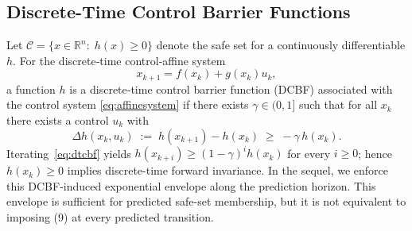 \documentclass[letterpaper, 10 pt, conference]{ieeeconf}
\begin{document}



\subsection{Discrete-Time Control Barrier Functions}
Let $\mathcal{C}=\{x\in\mathbb{R}^n:\; h(x)\ge 0\}$ denote the safe set for a continuously differentiable $h$.
For the discrete‐time control‐affine system
\begin{equation}
    x_{k+1}=f(x_k)+g(x_k)u_k, \label{eq:affinesystem}
\end{equation}
a function $h$ is a discrete‐time control barrier function (DCBF) associated with the control system \eqref{eq:affinesystem} if there exists $\gamma\in(0,1]$ such that for all $x_k$ there exists a control $u_k$ with
\begin{equation}
    \Delta h(x_k,u_k)\;:=\;h(x_{k+1})-h(x_k)\;\ge\;-\gamma\,h(x_k).
    \label{eq:dtcbf}
\end{equation}
Iterating~\eqref{eq:dtcbf} yields $h(x_{k+i})\ge(1-\gamma)^i h(x_k)$ for every $i\ge0$; hence $h(x_k)\ge0$ implies discrete-time forward invariance. In the sequel, we enforce this DCBF-induced exponential envelope along the prediction horizon. This envelope is sufficient for predicted safe-set membership, but it is not equivalent to imposing (9) at every predicted transition.
\end{document}
